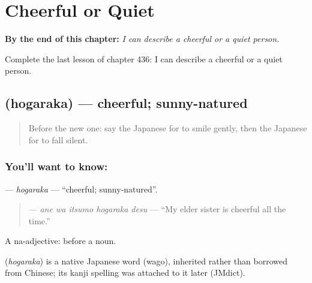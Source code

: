 
\chapter{Cheerful or Quiet}
\label{ch:ja-cheerful-or-quiet}

\begin{chapteropening}
\textbf{By the end of this chapter:} \emph{I can describe a cheerful or a quiet person.}

Complete the last lesson of chapter 436: I can describe a cheerful or a quiet person.
\end{chapteropening}

\section[\texorpdfstring{\ja{ほがらか} (hogaraka)}{ほがらか (hogaraka)}]{ (hogaraka) — cheerful; sunny-natured}

\label{lesson:JA-C436-hogaraka}



\begin{quote}
Before the new one: say the Japanese for to smile gently, then the Japanese for to fall silent.
\end{quote}

\subsection*{You'll want to know: }
\textbf{} — \emph{hogaraka} — \textquotedblleft{}cheerful; sunny-natured\textquotedblright{}.

\begin{quote}
\textbf{  } — \emph{ane wa itsumo hogaraka desu} — \textquotedblleft{}My elder sister is cheerful all the time.\textquotedblright{}
\end{quote}

A na-adjective:  before a noun.

\begin{cousinweb}
\textbf{} (\emph{hogaraka}) is a native Japanese word (wago), inherited rather than borrowed from Chinese; its kanji spelling was attached to it later (JMdict).
\end{cousinweb}

